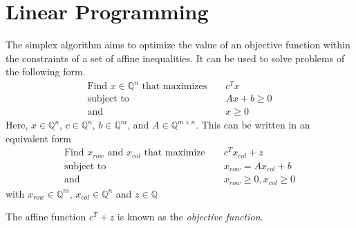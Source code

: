 \documentclass[11pt]{article} %
\begin{document}
\section{Linear Programming}
The simplex algorithm aims to optimize the value of an objective function within the constraints of a set of affine inequalities. It can be used to solve problems of the following form.
\begin{equation}
  \begin{aligned}
    \text{Find } x \in \mathbb{Q}^n \text{ that maximizes } && c^Tx \\
    \text{subject to } && A x + b \ge 0\\
    \text{and } && x \ge 0
  \end{aligned}
\end{equation}
Here, $x \in \mathbb{Q}^n$, $c \in \mathbb{Q}^n$, $b \in \mathbb{Q}^m$, and $A \in \mathbb{Q}^{m \times n}$.
This can be written in an equivalent form 
\begin{equation}
  \begin{aligned}
    \text{Find } x_{row} \text{ and } x_{col} \text{ that maximize } && c^Tx_{col} + z \\
    \text{subject to } && x_{row} = A x_{col} + b \\
    \text{and } && x_{row} \ge 0, x_{col} \ge 0
  \end{aligned}
\end{equation}
with $x_{row} \in \mathbb{Q}^m$, $x_{col} \in \mathbb{Q}^n$ and $z \in \mathbb{Q}$

The affine function $c^T+z$ is known as the \textit{objective function}.
\end{document}
